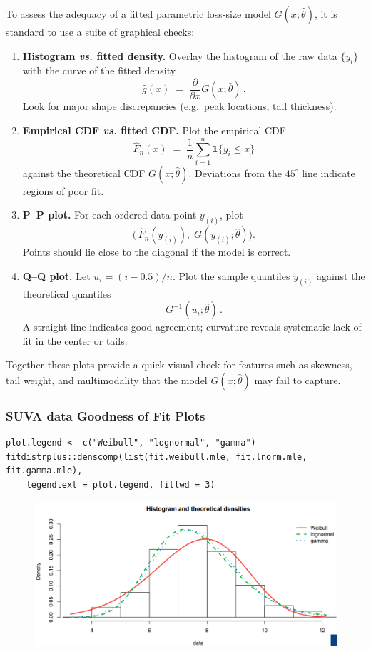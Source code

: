 \documentclass[11pt]{article}
\begin{document}
To assess the adequacy of a fitted parametric loss‐size model \(G(x;\widehat\theta)\), it is standard to use a suite of graphical checks:

\begin{enumerate}
  \item \textbf{Histogram \emph{vs.} fitted density.}  
    Overlay the histogram of the raw data \(\{y_i\}\) with the curve of the fitted density
    \[
      \widehat g(x) \;=\;\frac{\partial}{\partial x}G(x;\widehat\theta)\,.
    \]
    Look for major shape discrepancies (e.g.\ peak locations, tail thickness).

  \item \textbf{Empirical CDF \emph{vs.} fitted CDF.}  
    Plot the empirical CDF
    \[
      \widehat F_n(x)\;=\;\frac1n\sum_{i=1}^n\mathbf{1}\{y_i\le x\}
    \]
    against the theoretical CDF \(G(x;\widehat\theta)\).  Deviations from the \(45^\circ\) line indicate regions of poor fit.

  \item \textbf{P–P plot.}  
    For each ordered data point \(y_{(i)}\), plot
    \[
      \bigl(\,\widehat F_n(y_{(i)}),\;G(y_{(i)};\widehat\theta)\bigr).
    \]
    Points should lie close to the diagonal if the model is correct.

  \item \textbf{Q–Q plot.}  
    Let \(u_i = (i-0.5)/n\).  Plot the sample quantiles \(y_{(i)}\) against the theoretical quantiles
    \[
      G^{-1}(u_i;\widehat\theta)\,.
    \]
    A straight line indicates good agreement; curvature reveals systematic lack of fit in the center or tails.
\end{enumerate}

\noindent Together these plots provide a quick visual check for features such as skewness, tail weight, and multimodality that the model \(G(x;\widehat\theta)\) may fail to capture.  


\subsubsection{SUVA data Goodness of Fit Plots}
\begin{lstlisting}
plot.legend <- c("Weibull", "lognormal", "gamma")
fitdistrplus::denscomp(list(fit.weibull.mle, fit.lnorm.mle, fit.gamma.mle),
    legendtext = plot.legend, fitlwd = 3)
\end{lstlisting}
\begin{figure}[H]
    \centering
    \includegraphics[width=0.7\linewidth]{SUVA - GOF - denscomp.png}
\end{figure}
\end{document}
